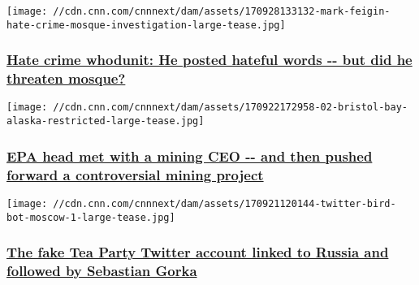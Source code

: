 \href{/2017/09/29/us/hate-crime-prosecution-invs/index.html}{}

\texttt{[image: //cdn.cnn.com/cnnnext/dam/assets/170928133132-mark-feigin-hate-crime-mosque-investigation-large-tease.jpg]}

\hypertarget{hate-crime-whodunit-he-posted-hateful-words----but-did-he-threaten-mosque}{%
\subsubsection{\texorpdfstring{\href{/2017/09/29/us/hate-crime-prosecution-invs/index.html}{Hate
crime whodunit: He posted hateful words -\/- but did he threaten
mosque?}}{Hate crime whodunit: He posted hateful words -\/- but did he threaten mosque?}}\label{hate-crime-whodunit-he-posted-hateful-words----but-did-he-threaten-mosque}}

\href{/2017/09/22/politics/pebble-epa-bristol-bay-invs/index.html}{}

\texttt{[image: //cdn.cnn.com/cnnnext/dam/assets/170922172958-02-bristol-bay-alaska-restricted-large-tease.jpg]}

\hypertarget{epa-head-met-with-a-mining-ceo----and-then-pushed-forward-a-controversial-mining-project}{%
\subsubsection{\texorpdfstring{\href{/2017/09/22/politics/pebble-epa-bristol-bay-invs/index.html}{EPA
head met with a mining CEO -\/- and then pushed forward a controversial
mining
project}}{EPA head met with a mining CEO -\/- and then pushed forward a controversial mining project}}\label{epa-head-met-with-a-mining-ceo----and-then-pushed-forward-a-controversial-mining-project}}

\href{/2017/09/21/politics/tpartynews-twitter-russia-link/index.html}{}

\texttt{[image: //cdn.cnn.com/cnnnext/dam/assets/170921120144-twitter-bird-bot-moscow-1-large-tease.jpg]}

\hypertarget{the-fake-tea-party-twitter-account-linked-to-russia-and-followed-by-sebastian-gorka}{%
\subsubsection{\texorpdfstring{\href{/2017/09/21/politics/tpartynews-twitter-russia-link/index.html}{The
fake Tea Party Twitter account linked to Russia and followed by
Sebastian
Gorka}}{The fake Tea Party Twitter account linked to Russia and followed by Sebastian Gorka}}\label{the-fake-tea-party-twitter-account-linked-to-russia-and-followed-by-sebastian-gorka}}

